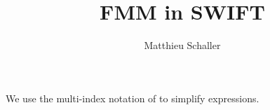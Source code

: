 \documentclass[fleqn, usenatbib, useAMS, a4paper]{mnras}
\title{FMM in SWIFT}
\author{Matthieu Schaller}
\begin{document}
\maketitle

We use the multi-index notation of \cite{Dehnen2014} to simplify expressions.







\appendix
\onecolumn

\end{document}
